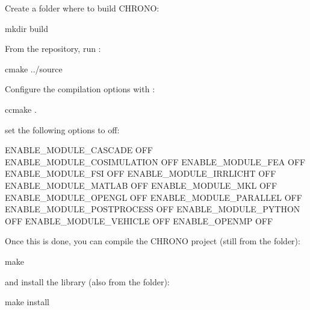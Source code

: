 Create a folder where to build CHRONO:
\begin{shellcode}
mkdir build 
\end{shellcode}
From the  repository, run :
\begin{shellcode}
cmake ../source 
\end{shellcode}
Configure the compilation options with :
\begin{shellcode}
ccmake .
\end{shellcode}
set the following options to off:
\begin{shellcode}
 ENABLE_MODULE_CASCADE            OFF                                                                                                                
 ENABLE_MODULE_COSIMULATION       OFF                                                                                                                
 ENABLE_MODULE_FEA                OFF                                                                                                                
 ENABLE_MODULE_FSI                OFF                                                                                                                
 ENABLE_MODULE_IRRLICHT           OFF                                                                                                                
 ENABLE_MODULE_MATLAB             OFF                                                                                                                
 ENABLE_MODULE_MKL                OFF                                                                                                                
 ENABLE_MODULE_OPENGL             OFF                                                                                                                
 ENABLE_MODULE_PARALLEL           OFF                                                                                                                
 ENABLE_MODULE_POSTPROCESS        OFF                                                                                                                
 ENABLE_MODULE_PYTHON             OFF                                                                                                                
 ENABLE_MODULE_VEHICLE            OFF                                                                                                                
 ENABLE_OPENMP                    OFF
\end{shellcode}

Once this is done, you can compile the CHRONO project 
(still from the  folder):
\begin{shellcode}
make
\end{shellcode}
and install the library (also from the  folder):
\begin{shellcode}
make install
\end{shellcode}

